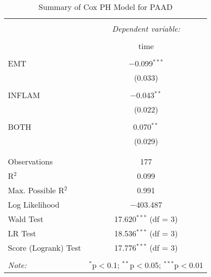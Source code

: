 
\begin{table}[!htbp] \centering 
  \caption{Summary of Cox PH Model for PAAD} 
  \label{table:PAAD_cph} 
\begin{tabular}{@{\extracolsep{5pt}}lc} 
\\[-1.8ex]\hline 
\hline \\[-1.8ex] 
 & \multicolumn{1}{c}{\textit{Dependent variable:}} \\ 
\cline{2-2} 
\\[-1.8ex] & time \\ 
\hline \\[-1.8ex] 
 EMT & $-$0.099$^{***}$ \\ 
  & (0.033) \\ 
  & \\ 
 INFLAM & $-$0.043$^{**}$ \\ 
  & (0.022) \\ 
  & \\ 
 BOTH & 0.070$^{**}$ \\ 
  & (0.029) \\ 
  & \\ 
\hline \\[-1.8ex] 
Observations & 177 \\ 
R$^{2}$ & 0.099 \\ 
Max. Possible R$^{2}$ & 0.991 \\ 
Log Likelihood & $-$403.487 \\ 
Wald Test & 17.620$^{***}$ (df = 3) \\ 
LR Test & 18.536$^{***}$ (df = 3) \\ 
Score (Logrank) Test & 17.776$^{***}$ (df = 3) \\ 
\hline 
\hline \\[-1.8ex] 
\textit{Note:}  & \multicolumn{1}{r}{$^{*}$p$<$0.1; $^{**}$p$<$0.05; $^{***}$p$<$0.01} \\ 
\end{tabular} 
\end{table} 
